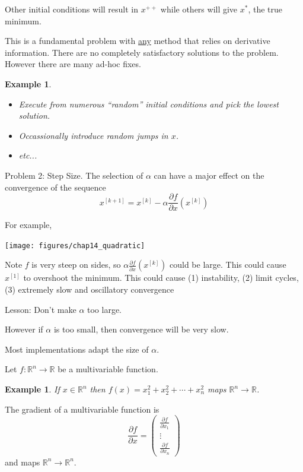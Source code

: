 \documentclass{article}
\newtheorem{example}[theorem]{Example}
\begin{document}
	Other initial conditions will result in 
	$x^{++}$ while others will give $x^\ast$, the true minimum.
	
	
	This is a fundamental problem with \underline{any} method that relies on derivative information.  There are no completely satisfactory solutions to the problem.  However there are many ad-hoc fixes.	

	
	\begin{example}
		\begin{itemize}
		\item Execute from numerous ``random'' initial conditions and pick the lowest solution.
		\item Occassionally introduce random jumps in $x$.
		\item etc...
		\end{itemize}
	\end{example}

	{\color{blue}Problem 2: Step Size.}
	The selection of $\alpha$ can have a major effect on the convergence of the sequence
	\[ 
		x^{[k+1]} = x^{[k]} - \alpha \frac{\partial f}{\partial x}(x^{[k]}) 
	\]
	
	For example,
	\begin{center}
		\texttt{[image: figures/chap14\_quadratic]}
	\end{center}
	Note $f$ is very steep on sides, so $\alpha \frac{\partial f}{\partial x}(x^{[k]})$ could be large.  This could cause $x^{[1]}$ to overshoot the minimum.  This could cause (1) instability, (2) limit cycles, (3) extremely slow and oscillatory convergence	

	{\color{blue}Lesson:}  
		Don't make $\alpha$ too large.
		
	
	However if $\alpha$ is too small, then convergence will be very slow.
	
	
	Most implementations adapt the size of $\alpha$.

	Let $f:\mathbb{R}^n\to\mathbb{R}$ be a multivariable function.
	\begin{example}
		If $x \in \mathbb{R}^n$ then 
		$f(x) = x_1^2 + x_2^2 + \cdots + x_n^2$ maps $\mathbb{R}^n\to\mathbb{R}$.	
	\end{example}
	The gradient of a multivariable function is
	\[ 
		\frac{\partial  f}{\partial  x} = \begin{pmatrix}
	    \frac{\partial  f}{\partial  x_1}\\
	    \vdots\\
	    \frac{\partial  f}{\partial  x_n}
	  \end{pmatrix} 
	\] 
	and maps $\mathbb{R}^n \to \mathbb{R}^n$.
\end{document}
